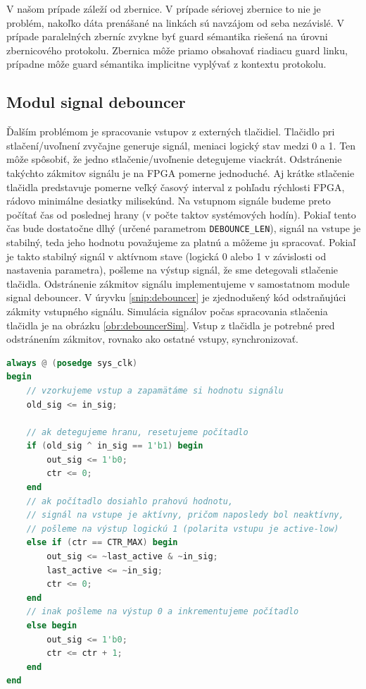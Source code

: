 V našom prípade záleží od zbernice. V prípade sériovej zbernice to nie je problém, nakoľko dáta prenášané na linkách sú navzájom od seba nezávislé. V prípade paralelných zberníc zvykne byť guard sémantika riešená na úrovni zbernicového protokolu. Zbernica môže priamo obsahovať riadiacu guard linku, prípadne môže guard sémantika implicitne vyplývať z kontextu protokolu.

\subsection{Modul signal debouncer} \label{subsek:debouncer}
Ďalším problémom je spracovanie vstupov z externých tlačidiel. Tlačidlo pri stlačení/uvoľnení zvyčajne generuje  signál, meniaci logický stav medzi 0 a 1. Ten môže spôsobiť, že jedno stlačenie/uvoľnenie detegujeme viackrát. Odstránenie takýchto zákmitov signálu je na FPGA pomerne jednoduché. Aj krátke stlačenie tlačidla predstavuje pomerne veľký časový interval z pohľadu rýchlosti FPGA, rádovo minimálne desiatky milisekúnd. Na vstupnom signále budeme preto počítať čas od poslednej hrany (v počte taktov systémových hodín). Pokiaľ tento čas bude dostatočne dlhý (určené parametrom \texttt{DEBOUNCE\_LEN}), signál na vstupe je stabilný, teda jeho hodnotu považujeme za platnú a môžeme ju spracovať. Pokiaľ je takto stabilný signál v aktívnom stave (logická 0 alebo 1 v závislosti od nastavenia parametra), pošleme na výstup signál, že sme detegovali stlačenie tlačidla. Odstránenie zákmitov signálu implementujeme v samostatnom module signal debouncer. V úryvku \ref{snip:debouncer} je zjednodušený kód odstraňujúci zákmity vstupného signálu. Simulácia signálov počas spracovania stlačenia tlačidla je na obrázku \ref{obr:debouncerSim}. Vstup z tlačidla je potrebné pred odstránením zákmitov, rovnako ako ostatné vstupy, synchronizovať.

\begin{lstlisting}[float,language=Verilog,caption={Zjednodušený kód pre odstránenie zákmitov signálu \texttt{in\_sig}. V príklade je polarita vstupu invertovaná (tzv. active-low).},label=snip:debouncer]
always @ (posedge sys_clk)
begin
    // vzorkujeme vstup a zapamätáme si hodnotu signálu
	old_sig <= in_sig;
		
    // ak detegujeme hranu, resetujeme počítadlo
    if (old_sig ^ in_sig == 1'b1) begin
        out_sig <= 1'b0;
        ctr <= 0;
    end
    // ak počítadlo dosiahlo prahovú hodnotu,
    // signál na vstupe je aktívny, pričom naposledy bol neaktívny,
    // pošleme na výstup logickú 1 (polarita vstupu je active-low)
    else if (ctr == CTR_MAX) begin
        out_sig <= ~last_active & ~in_sig;
        last_active <= ~in_sig;
        ctr <= 0;
    end
    // inak pošleme na výstup 0 a inkrementujeme počítadlo
    else begin
        out_sig <= 1'b0;
        ctr <= ctr + 1;
	end
end
\end{lstlisting}

